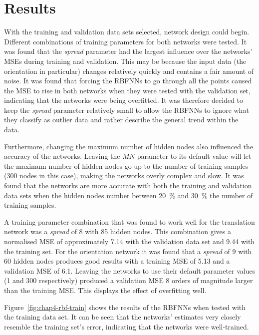 \section{Results}

With the training and validation data sets selected, network design could begin. Different combinations of training parameters for both networks were tested. It was found that the \emph{spread} parameter had the largest influence over the networks' MSEs during training and validation. This may be because the input data (the orientation in particular) changes relatively quickly and contains a fair amount of noise. It was found that forcing the RBFNNs to go through all the points caused the MSE to rise in both networks when they were tested with the validation set, indicating that the networks were being overfitted. It was therefore decided to keep the \emph{spread} parameter relatively small to allow the RBFNNs to ignore what they classify as outlier data and rather describe the general trend within the data. 

Furthermore, changing the maximum number of hidden nodes also influenced the accuracy of the networks. Leaving the $\mathit{MN}$ parameter to its default value will let the maximum number of hidden nodes go up to the number of training samples (300 nodes in this case), making the networks overly complex and slow. It was found that the networks are more accurate with both the training and validation data sets when the hidden nodes number between 20~\% and 30~\% the number of training samples. 

A training parameter combination that was found to work well for the translation network was a \emph{spread} of 8 with 85 hidden nodes. This combination gives a normalised MSE of approximately 7.14 with the validation data set and 9.44 with the training set. For the orientation network it was found that a \emph{spread} of 9 with 60 hidden nodes produces good results with a training MSE of 5.13 and a validation MSE of 6.1. Leaving the networks to use their default parameter values (1 and 300 respectively) produced a validation MSE 8 orders of magnitude larger than the training MSE\@. This displays the effect of overfitting well. 

Figure~\ref{fig:chap4-rbf-train} shows the results of the RBFNNs when tested with the training data set. It can be seen that the networks' estimates very closely resemble the training set's error, indicating that the networks were well-trained. 

